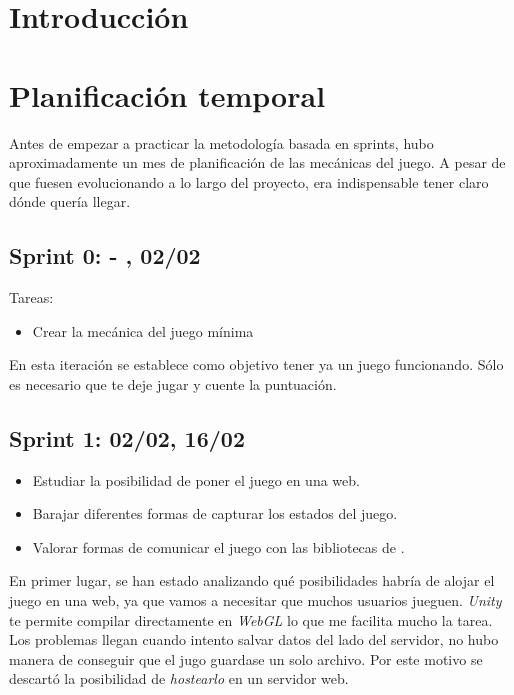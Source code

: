 
\section{Introducción}



\section{Planificación temporal}

Antes de empezar a practicar la metodología basada en sprints, hubo aproximadamente un mes de planificación de las mecánicas del juego. A pesar de que fuesen evolucionando a lo largo del proyecto, era indispensable tener claro dónde quería llegar.


\subsection{Sprint 0:  - , 02/02 }
Tareas:
\begin{itemize}
    \item Crear la mecánica del juego mínima
\end{itemize}


En esta iteración se establece como objetivo tener ya un juego funcionando. Sólo es necesario que te deje jugar y cuente la puntuación.

\subsection{Sprint 1:  02/02, 16/02}

\begin{itemize}
     \item Estudiar la posibilidad de poner el juego en una web. 
     \item Barajar diferentes formas de capturar los estados del juego. \item Valorar formas de comunicar el juego con las bibliotecas de .
\end{itemize}

En primer lugar, se han estado analizando qué posibilidades habría de alojar el juego en una web, ya que vamos a necesitar que muchos usuarios jueguen. \emph{Unity} te permite compilar directamente en \emph{WebGL} lo que me facilita mucho la tarea. Los problemas llegan cuando intento salvar datos del lado del servidor, no hubo manera de conseguir que el jugo guardase un solo archivo. Por este motivo se descartó la posibilidad de \emph{hostearlo} en un servidor web.

